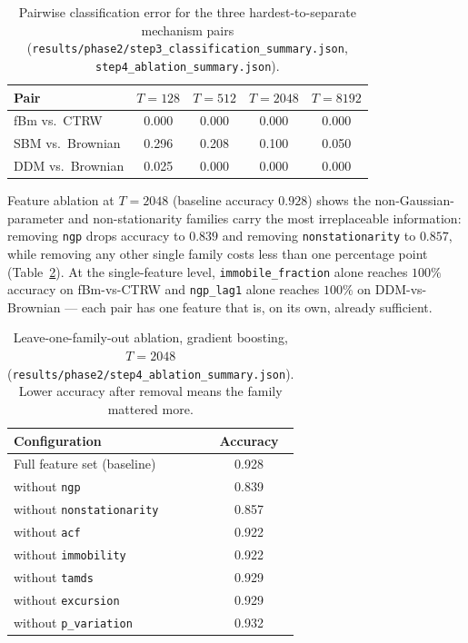 \documentclass[11pt]{article}
\newcommand{\code}[1]{\texttt{#1}}
\begin{document}
\begin{table}[htbp]
\centering
\caption{Pairwise classification error for the three hardest-to-separate
mechanism pairs (\code{results/phase2/step3\_classification\_summary.json},
\code{step4\_ablation\_summary.json}).}
\label{tab:pairwise}
\begin{tabular}{lcccc}
\toprule
Pair & $T{=}128$ & $T{=}512$ & $T{=}2048$ & $T{=}8192$ \\
\midrule
fBm vs.\ CTRW & 0.000 & 0.000 & 0.000 & 0.000 \\
SBM vs.\ Brownian & 0.296 & 0.208 & 0.100 & 0.050 \\
DDM vs.\ Brownian & 0.025 & 0.000 & 0.000 & 0.000 \\
\bottomrule
\end{tabular}
\end{table}

Feature ablation at $T{=}2048$ (baseline accuracy $0.928$) shows the
non-Gaussian-parameter and non-stationarity families carry the most
irreplaceable information: removing \code{ngp} drops accuracy to $0.839$ and
removing \code{nonstationarity} to $0.857$, while removing any other single
family costs less than one percentage point (Table~\ref{tab:ablation}). At
the single-feature level, \code{immobile\_fraction} alone reaches $100\%$
accuracy on fBm-vs-CTRW and \code{ngp\_lag1} alone reaches $100\%$ on
DDM-vs-Brownian --- each pair has one feature that is, on its own, already
sufficient.

\begin{table}[htbp]
\centering
\caption{Leave-one-family-out ablation, gradient boosting, $T{=}2048$
(\code{results/phase2/step4\_ablation\_summary.json}). Lower accuracy after
removal means the family mattered more.}
\label{tab:ablation}
\begin{tabular}{lc}
\toprule
Configuration & Accuracy \\
\midrule
Full feature set (baseline) & 0.928 \\
without \code{ngp} & 0.839 \\
without \code{nonstationarity} & 0.857 \\
without \code{acf} & 0.922 \\
without \code{immobility} & 0.922 \\
without \code{tamds} & 0.929 \\
without \code{excursion} & 0.929 \\
without \code{p\_variation} & 0.932 \\
\bottomrule
\end{tabular}
\end{table}
\end{document}
